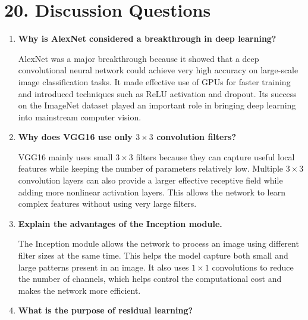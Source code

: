 \documentclass[11pt]{article}
\begin{document}





\section*{20. Discussion Questions}

\begin{enumerate}

\item \textbf{Why is AlexNet considered a breakthrough in deep learning?}

AlexNet was a major breakthrough because it showed that a deep convolutional neural network could achieve very high accuracy on large-scale image classification tasks. It made effective use of GPUs for faster training and introduced techniques such as ReLU activation and dropout. Its success on the ImageNet dataset played an important role in bringing deep learning into mainstream computer vision.

\vspace{5mm}
\item \textbf{Why does VGG16 use only $3\times3$ convolution filters?}

VGG16 mainly uses small $3\times3$ filters because they can capture useful local features while keeping the number of parameters relatively low. Multiple $3\times3$ convolution layers can also provide a larger effective receptive field while adding more nonlinear activation layers. This allows the network to learn complex features without using very large filters.

\vspace{5mm}
\item \textbf{Explain the advantages of the Inception module.}

The Inception module allows the network to process an image using different filter sizes at the same time. This helps the model capture both small and large patterns present in an image. It also uses $1\times1$ convolutions to reduce the number of channels, which helps control the computational cost and makes the network more efficient.
\vspace{5mm}
\item \textbf{What is the purpose of residual learning?}


\end{enumerate}
\end{document}
